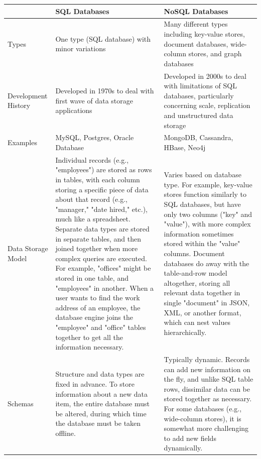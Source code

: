 \begin{table}[h!]
    \tiny
   
\begin{tabular}{ |L{0.1\paperwidth}|L{0.3\paperwidth}|L{0.3\paperwidth}|}
\hline
	&
	SQL Databases &
	NoSQL Databases
 
\\ \hline
	Types&
	One type (SQL database) with minor variations&
	Many different types including key-value stores, document databases, wide-column stores, and graph databases
	
\\ \hline
	Development History&
	Developed in 1970s to deal with first wave of data storage applications&
	Developed in 2000s to deal with limitations of SQL databases, particularly concerning scale, replication and unstructured data storage
	
\\ \hline
	Examples&
	MySQL, Postgres, Oracle Database&
	MongoDB, Cassandra, HBase, Neo4j
\\ \hline
	Data Storage Model&
	Individual records (e.g., "employees") are stored as rows in tables, with each column storing a specific piece of data about that record (e.g., "manager," "date hired," etc.), much like a spreadsheet. Separate data types are stored in separate tables, and then joined together when more complex queries are executed. For example, "offices" might be stored in one table, and "employees" in another. When a user wants to find the work address of an employee, the database engine joins the "employee" and "office" tables together to get all the information necessary.&
	Varies based on database type. For example, key-value stores function similarly to SQL databases, but have only two columns ("key" and "value"), with more complex information sometimes stored within the "value" columns. Document databases do away with the table-and-row model altogether, storing all relevant data together in single "document" in JSON, XML, or another format, which can nest values hierarchically.
	

\\ \hline
	Schemas&
	Structure and data types are fixed in advance. To store information about a new data item, the entire database must be altered, during which time the database must be taken offline.&
	Typically dynamic. Records can add new information on the fly, and unlike SQL table rows, dissimilar data can be stored together as necessary. For some databases (e.g., wide-column stores), it is somewhat more challenging to add new fields dynamically.


\end{tabular}
\end{table}
